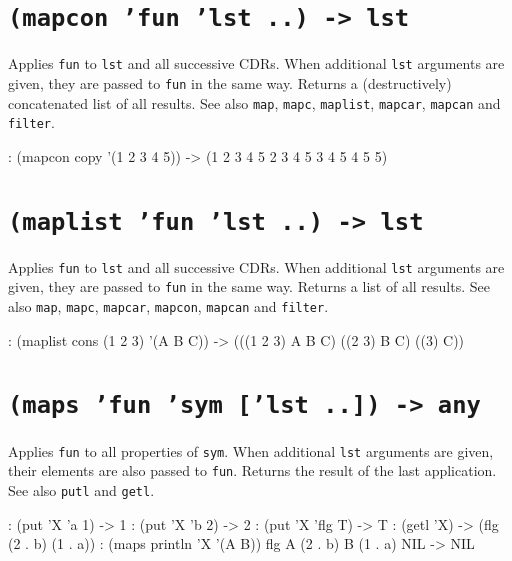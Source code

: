  
\section*{\texttt{(mapcon 'fun 'lst ..) -> lst}}
\label{sec:func-ref-M-(mapcon 'fun 'lst ..) -> lst}


Applies \texttt{fun} to \texttt{lst} and all successive CDRs. When additional \texttt{lst}
arguments are given, they are passed to \texttt{fun} in the same way. Returns a
(destructively) concatenated list of all results. See also \texttt{map},
\texttt{mapc}, \texttt{maplist}, \texttt{mapcar}, \texttt{mapcan} and \texttt{filter}.


\begin{wideverbatim}
: (mapcon copy '(1 2 3 4 5))
-> (1 2 3 4 5 2 3 4 5 3 4 5 4 5 5)
\end{wideverbatim}

 
\section*{\texttt{(maplist 'fun 'lst ..) -> lst}}
\label{sec:func-ref-M-(maplist 'fun 'lst ..) -> lst}


Applies \texttt{fun} to \texttt{lst} and all successive CDRs. When additional \texttt{lst}
arguments are given, they are passed to \texttt{fun} in the same way. Returns a
list of all results. See also \texttt{map}, \texttt{mapc}, \texttt{mapcar}, \texttt{mapcon},
\texttt{mapcan} and \texttt{filter}.


\begin{wideverbatim}
: (maplist cons (1 2 3) '(A B C))
-> (((1 2 3) A B C) ((2 3) B C) ((3) C))
\end{wideverbatim}

 
\section*{\texttt{(maps 'fun 'sym ['lst ..]) -> any}}
\label{sec:func-ref-M-(maps 'fun 'sym ['lst ..]) -> any}


Applies \texttt{fun} to all properties of \texttt{sym}. When additional \texttt{lst}
arguments are given, their elements are also passed to \texttt{fun}. Returns
the result of the last application. See also \texttt{putl} and \texttt{getl}.


\begin{wideverbatim}
: (put 'X 'a 1)
-> 1
: (put 'X 'b 2)
-> 2
: (put 'X 'flg T)
-> T
: (getl 'X)
-> (flg (2 . b) (1 . a))
: (maps println 'X '(A B))
flg A
(2 . b) B
(1 . a) NIL
-> NIL
\end{wideverbatim}


